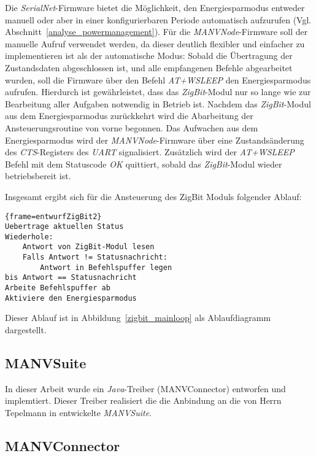 Die \emph{SerialNet}-Firmware bietet die Möglichkeit, den Energiesparmodus entweder manuell oder aber in einer 
konfigurierbaren Periode automatisch aufzurufen (Vgl. Abschnitt~\ref{analyse_powermanagement}). Für die
\emph{MANVNode}-Firmware soll der manuelle Aufruf verwendet werden, da dieser deutlich flexibler und einfacher zu
implementieren ist als der automatische Modus: Sobald die Übertragung der Zustandsdaten abgeschlossen ist, und
alle empfangenen Befehle abgearbeitet wurden, soll die Firmware über den Befehl \emph{AT+WSLEEP} den Energiesparmodus
aufrufen. Hierdurch ist gewährleistet, dass das \emph{ZigBit}-Modul nur so lange wie zur Bearbeitung aller Aufgaben
notwendig in Betrieb ist. Nachdem das \emph{ZigBit}-Modul aus dem Energiesparmodus zurückkehrt wird die Abarbeitung
der Ansteuerungsroutine von vorne begonnen. Das Aufwachen aus dem Energiesparmodus wird der \emph{MANVNode}-Firmware
über eine Zustandsänderung des \emph{CTS}-Registers des \emph{UART} signalisiert. Zusätzlich wird der \emph{AT+WSLEEP}
Befehl mit dem Statuscode \emph{OK} quittiert, sobald das \emph{ZigBit}-Modul wieder betriebsbereit ist. 


Insgesamt ergibt sich für die Ansteuerung des ZigBit Moduls folgender Ablauf:

\begin{lstlisting}{frame=entwurfZigBit2}
Uebertrage aktuellen Status
Wiederhole:
    Antwort von ZigBit-Modul lesen
    Falls Antwort != Statusnachricht:
        Antwort in Befehlspuffer legen
bis Antwort == Statusnachricht    
Arbeite Befehlspuffer ab
Aktiviere den Energiesparmodus
\end{lstlisting}

Dieser Ablauf ist in Abbildung~\ref{zigbit_mainloop} als Ablaufdiagramm dargestellt.

\subsection{MANVSuite}

In dieser Arbeit wurde ein \emph{Java}-Treiber (MANVConnector) entworfen und implemtiert. Dieser Treiber realisiert die die 
Anbindung an die von Herrn Tepelmann in \cite{Jan} entwickelte \emph{MANVSuite}. 


\subsection{MANVConnector}


